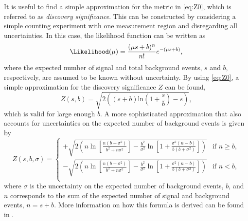 It is useful to find a simple approximation for the metric in \cref{eq:Z0}, which is referred to as \emph{discovery significance}. 
This can be constructed by considering a simple counting experiment with one measurement region and disregarding all uncertainties. In this case, the likelihood function can be written as
\begin{equation}
  \Likelihood(\mu) = \frac{(\mu s +b)^n}{n!} e^{-(\mu s+b)},
\end{equation}
where the expected number of signal and total background events, $s$ and $b$, respectively, are assumed to be known without uncertainty.
By using \cref{eq:Z0}, a simple approximation for the discovery significance $Z$ can be found,
\begin{equation}
    \label{eq:discovery-significance}
  Z(s, b) = \sqrt{2 \left( \left(s + b\right) \text{ln}\left(1 + \frac{s}{b}\right) - s\right)},
\end{equation}
which is valid for large enough $b$.
A more sophisticated approximation that also accounts for uncertainties on the expected number of background events is given by
\begin{equation}
    \label{eq:simple-sign}
    Z(s, b, \sigma) = 
    \begin{cases}
    + \sqrt{ 2 \left( n \ln \left[ \frac{n \left( b + \sigma^2 \right)}{b^2 + n \sigma^2} \right] - \frac{b^2}{\sigma^2} \ln \left[ 1 + \frac{\sigma^2 \left(n - b \right) }{b \left( b + \sigma ^2 \right) } \right] \right)   } & \text{if } n \geq b, \\
    - \sqrt{ 2 \left( n \ln \left[ \frac{n \left( b + \sigma^2 \right)}{b^2 + n \sigma^2} \right] - \frac{b^2}{\sigma^2} \ln \left[ 1 + \frac{\sigma^2 \left(n - b \right) }{b \left( b + \sigma ^2 \right) } \right] \right)   } & \text{if } n < b, \\
\end{cases}
\end{equation}
where $\sigma$ is the uncertainty on the expected number of background events, $b$, and $n$ corresponds to the sum of the expected number of signal and background events, $n = s+b$.
More information on how this formula is derived can be found in .



